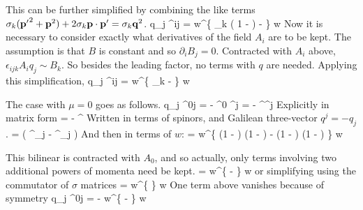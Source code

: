 This can be further simplified by combining the like terms $\sigma_k (\mathbf{p'}^2 + \mathbf{p}^2 ) + 2 \sigma_k \mathbf{p} \cdot \mathbf{p'} = \sigma_k \mathbf{q}^2$.
\beq
	\srb  {} q_j \sigma^{ij} \sr 
		=  w^\dagger \left \{
			\sigma_k \left( 1 -  \right ) -  
		\right \} w 
\eeq
Now it is necessary to consider exactly what derivatives of the field $A_i$ are to be kept.  The assumption is that $B$ is constant and so $\partial_i B_j = 0$.  Contracted with $A_i$ above, $\epsilon_{ijk} A_i q_j \sim B_k$.  So besides the leading factor, no terms with $q$ are needed.  Applying this simplification,
\beq \label{eq:Sh:Ti}
	\srb  {} q_j \sigma^{ij} \sr 
		=  w^\dagger \left \{
			\sigma_k -  
		\right \} w 
\eeq






The case with $\mu=0$ goes as follows.
\beq
	\srb  {} q_j \sigma^{0j} \sr
		=	 -  \srb \gamma^0 \gamma^j \sr 		
 		=  -  \sr^\dagger \gamma^j \sr
\eeq
Explicitly in matrix form 
\beq
	 = -  \sr^\dagger {} \sr 
\eeq
 Written in terms of spinors, and Galilean three-vector $q^j= -q_j$.
 \beq
 	=   \left( \eta^\dagger \sigma_j \chi - \chi^\dagger \sigma_j \eta \right )
 \eeq
 And then in terms of $w$:
\beq
	=    w^\dagger \left \{
		\left(1 -  \right )   \left(1 -  \right )
		- \left(1 -  \right )  \left(1 -  \right )
	\right \} w
\eeq

This bilinear is contracted with $A_0$, and so actually, only terms involving two additional powers of momenta need be kept.
\beq
	=    w^\dagger \left \{
		-   
	\right \} w
\eeq
or simplifying using the commutator of $\sigma$ matrices
\beq 
	=     w^\dagger \left \{
	\right \} w
\eeq
One term above vanishes because of symmetry
\beq \label{eq:Sh:T0}
\srb  {} q_j \sigma^{0j} \sr
	=  -  w^\dagger \left \{
			-  
	\right \} w
\eeq


